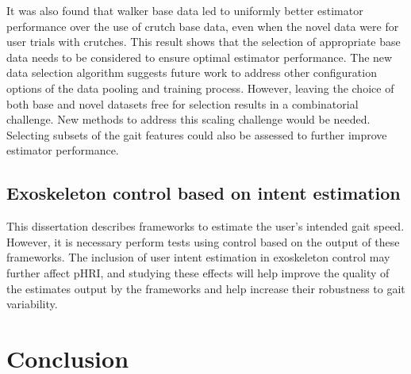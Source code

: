It was also found that walker base data led to uniformly better estimator performance over the use of crutch base data, even when the novel data were for user trials with crutches. This result shows that the selection of appropriate base data needs to be considered to ensure optimal estimator performance. The new data selection algorithm suggests future work to address other configuration options of the data pooling and training process. However, leaving the choice of both base and novel datasets free for selection results in a combinatorial challenge. New methods to address this scaling challenge would be needed. Selecting subsets of the gait features could also be assessed to further improve estimator performance.

\subsection{Exoskeleton control based on intent estimation}

This dissertation describes frameworks to estimate the user's intended gait speed. However, it is necessary perform tests using control based on the output of these frameworks. The inclusion of user intent estimation in exoskeleton control may further affect pHRI, and studying these effects will help improve the quality of the estimates output by the frameworks and help increase their robustness to gait variability.

\section{Conclusion}
%

